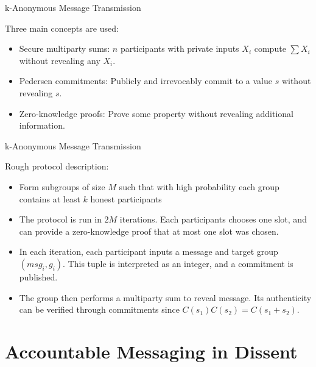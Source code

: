 \documentclass[]{beamer} %
\begin{document}
\begin{frame}{k-Anonymous Message Transmission}

Three main concepts are used:

\begin{itemize}
\item Secure multiparty sums: %
      $n$ participants with private inputs $X_i$ compute $\sum X_i$ without
      revealing any $X_i$.
\item Pedersen commitments: Publicly and irrevocably commit to a value $s$ without
      revealing $s$.
\item Zero-knowledge proofs: Prove some property without revealing additional information.
\end{itemize}

\end{frame}

\begin{frame}{k-Anonymous Message Transmission}

Rough protocol description:

\begin{itemize}
\item Form subgroups of size $M$ such that with high probability each group contains at
      least $k$ honest participants
\item The protocol is run in $2M$ iterations. Each participants chooses one slot,
      and can provide a zero-knowledge proof that at most one slot was chosen.
\item In each iteration, each participant inputs a message and target group
      $(msg_i, g_i)$. This tuple is interpreted as an integer, and a commitment
      is published.
\item The group then performs a multiparty sum to reveal message. Its authenticity can
      be verified through commitments since $C(s_1)C(s_2) = C(s_1 + s_2)$.
\end{itemize}

\end{frame}

\section{Accountable Messaging in Dissent}
\end{document}
